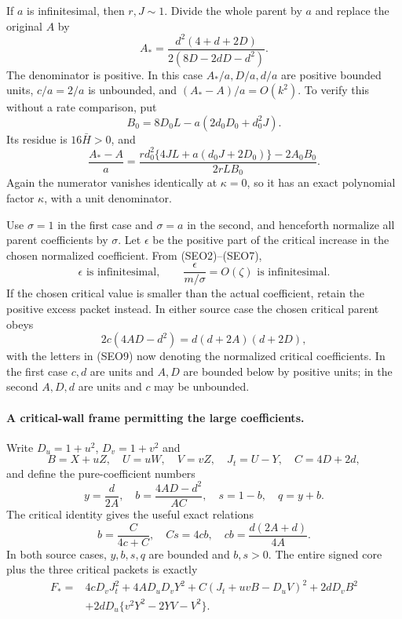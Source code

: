 If $a$ is infinitesimal, then $r,J\sim1$. Divide the whole parent
by $a$ and replace the original $A$ by
\[
 A_* =\frac{d^2(4+d+2D)}{2(8D-2dD-d^2)}.       \tag{SEO6}
\]
The denominator is positive. In this case
$A_*/a,D/a,d/a$ are positive bounded units, $c/a=2/a$ is
unbounded, and $(A_*-A)/a=O(k^2)$. To verify this without a
rate comparison, put
\[
 B_0=8D_0L-a(2d_0D_0+d_0^2J).
\]
Its residue is $16\bar H>0$, and
\[
 \frac{A_*-A}{a}=
 \frac{r d_0^2\{4JL+a(d_0J+2D_0)\}-2A_0B_0}
 {2rLB_0}.                                           \tag{SEO7}
\]
Again the numerator vanishes identically at $\kappa=0$, so it has
an exact polynomial factor $\kappa$, with a unit denominator.

Use $\sigma=1$ in the first case and $\sigma=a$ in the second,
and henceforth normalize all parent coefficients by $\sigma$.
Let $\epsilon$ be the positive part of the critical increase in the
chosen normalized coefficient. From (SEO2)--(SEO7),
\[
 \epsilon\text{ is infinitesimal},\qquad
 \frac{\epsilon}{m/\sigma}=O(\zeta)\text{ is infinitesimal}.
 \tag{SEO8}
\]
If the chosen critical value is smaller than the actual coefficient,
retain the positive excess packet instead. In either source case
the chosen critical parent obeys
\[
 2c(4AD-d^2)=d(d+2A)(d+2D),                  \tag{SEO9}
\]
with the letters in (SEO9) now denoting the normalized critical
coefficients. In the first case $c,d$ are units and $A,D$ are
bounded below by positive units; in the second $A,D,d$ are units
and $c$ may be unbounded.

\paragraph{A critical-wall frame permitting the large coefficients.}
Write $D_u=1+u^2$, $D_v=1+v^2$ and
\[
 B=X+uZ,\quad U=uW,\quad V=vZ,\quad J_t=U-Y,
 \quad C=4D+2d,
\]
and define the pure-coefficient numbers
\[
 y=\frac d{2A},\quad
 b=\frac{4AD-d^2}{AC},\quad s=1-b,\quad q=y+b.
\]
The critical identity gives the useful exact relations
\[
 b=\frac C{4c+C},\quad Cs=4cb,\quad
 cb=\frac{d(2A+d)}{4A}.                         \tag{SEO10}
\]
In both source cases, $y,b,s,q$ are bounded and $b,s>0$.
The entire signed core plus the three critical packets is exactly
\begin{align*}
 F_*={}&4cD_vJ_t^2+4AD_uD_vY^2
       +C(J_t+uvB-D_uV)^2+2dD_vB^2\\
       &+2dD_u\{v^2Y^2-2YV-V^2\}.              \tag{SEO11}
\end{align*}

